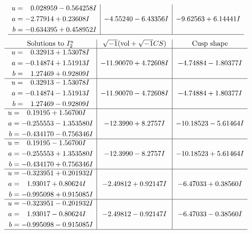 \documentclass[1p]{elsarticle_modified}
\theoremstyle{definition}
\newcommand{\I}{\sqrt{-1}}
\begin{document}
$$\begin{array}{c|c|c}
\begin{aligned}
u &= \phantom{-}0.028959 - 0.564258 I \\
a &= -2.77914 + 0.23608 I \\
b &= -0.634395 + 0.458952 I\end{aligned}
 & -4.55240 - 6.43356 I & -9.62563 + 6.14441 I\\
 \hline 
 \end{array}$$\newpage$$\begin{array}{c|c|c}  
\text{Solutions to }I^u_{2}& \I (\text{vol} + \sqrt{-1}CS) & \text{Cusp shape}\\
 \hline 
\begin{aligned}
u &= \phantom{-}0.32913 + 1.53078 I \\
a &= -0.14874 + 1.51913 I \\
b &= \phantom{-}1.27469 + 0.92809 I\end{aligned}
 & -11.90070 + 4.72608 I & -4.74884 - 1.80377 I \\ \hline\begin{aligned}
u &= \phantom{-}0.32913 - 1.53078 I \\
a &= -0.14874 - 1.51913 I \\
b &= \phantom{-}1.27469 - 0.92809 I\end{aligned}
 & -11.90070 - 4.72608 I & -4.74884 + 1.80377 I \\ \hline\begin{aligned}
u &= \phantom{-}0.19195 + 1.56700 I \\
a &= -0.255553 - 1.353580 I \\
b &= -0.434170 - 0.756346 I\end{aligned}
 & -12.3990 + 8.2757 I & -10.18523 - 5.61464 I \\ \hline\begin{aligned}
u &= \phantom{-}0.19195 - 1.56700 I \\
a &= -0.255553 + 1.353580 I \\
b &= -0.434170 + 0.756346 I\end{aligned}
 & -12.3990 - 8.2757 I & -10.18523 + 5.61464 I \\ \hline\begin{aligned}
u &= -0.323951 + 0.201932 I \\
a &= \phantom{-}1.93017 + 0.80624 I \\
b &= -0.995098 + 0.915085 I\end{aligned}
 & -2.49812 + 0.92147 I & -6.47033 + 0.38560 I \\ \hline\begin{aligned}
u &= -0.323951 - 0.201932 I \\
a &= \phantom{-}1.93017 - 0.80624 I \\
b &= -0.995098 - 0.915085 I\end{aligned}
 & -2.49812 - 0.92147 I & -6.47033 - 0.38560 I\\
 \hline 
 \end{array}$$\newpage
\end{document}
